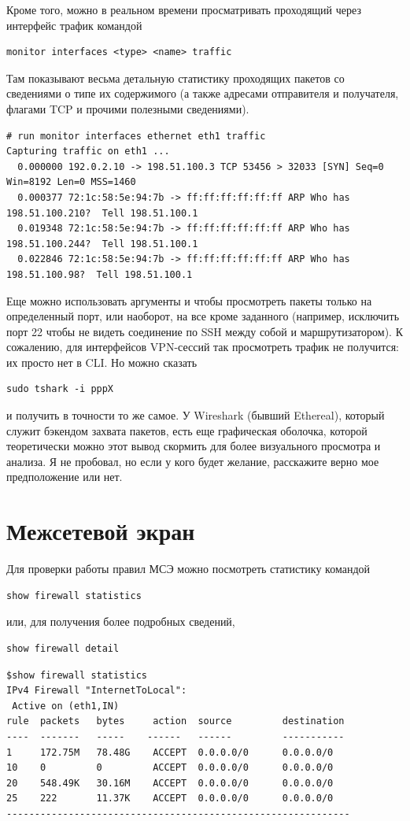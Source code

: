 \documentclass[a4paper,12pt, twoside, russian]{report}
\begin{document}
Кроме того, можно в реальном времени просматривать проходящий через интерфейс трафик командой 
\begin{verbatim}monitor interfaces <type> <name> traffic\end{verbatim} 
Там показывают весьма детальную статистику проходящих пакетов со сведениями о типе их содержимого
(а также адресами отправителя и получателя, флагами TCP и прочими полезными сведениями).
\begin{verbatim}
# run monitor interfaces ethernet eth1 traffic 
Capturing traffic on eth1 ...
  0.000000 192.0.2.10 -> 198.51.100.3 TCP 53456 > 32033 [SYN] Seq=0 Win=8192 Len=0 MSS=1460
  0.000377 72:1c:58:5e:94:7b -> ff:ff:ff:ff:ff:ff ARP Who has 198.51.100.210?  Tell 198.51.100.1
  0.019348 72:1c:58:5e:94:7b -> ff:ff:ff:ff:ff:ff ARP Who has 198.51.100.244?  Tell 198.51.100.1
  0.022846 72:1c:58:5e:94:7b -> ff:ff:ff:ff:ff:ff ARP Who has 198.51.100.98?  Tell 198.51.100.1
\end{verbatim}

Еще можно использовать аргументы  и 
чтобы просмотреть пакеты только 
на определенный порт, или наоборот, на все кроме заданного (например, исключить порт 22 чтобы не видеть
соединение по SSH между собой и маршрутизатором).
К сожалению, для интерфейсов VPN-сессий так просмотреть трафик не получится: их просто нет в CLI. 
Но можно сказать \begin{verbatim}sudo tshark -i pppX\end{verbatim} и получить в точности то же самое.
У Wireshark (бывший Ethereal), который служит бэкендом захвата пакетов, есть еще графическая оболочка,
которой теоретически можно этот вывод скормить для более визуального просмотра и анализа. Я не пробовал, 
но если у кого будет желание, расскажите верно мое предположение или нет.

\section{Межсетевой экран}

Для проверки работы правил МСЭ можно посмотреть статистику командой 
\begin{verbatim}show firewall statistics\end{verbatim} или, для получения более подробных сведений, 
\begin{verbatim}show firewall detail\end{verbatim}
\begin{verbatim}
$show firewall statistics
IPv4 Firewall "InternetToLocal":
 Active on (eth1,IN)
rule  packets   bytes     action  source         destination
----  -------   -----    ------   ------         -----------
1     172.75M   78.48G    ACCEPT  0.0.0.0/0      0.0.0.0/0
10    0         0         ACCEPT  0.0.0.0/0      0.0.0.0/0
20    548.49K   30.16M    ACCEPT  0.0.0.0/0      0.0.0.0/0
25    222       11.37K    ACCEPT  0.0.0.0/0      0.0.0.0/0
-------------------------------------------------------------
\end{verbatim}
\end{document}
